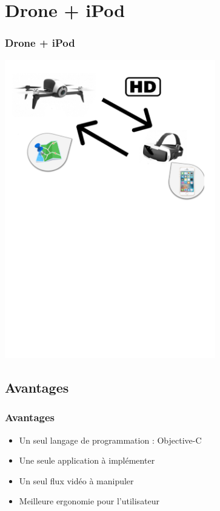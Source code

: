 \documentclass[11pt]{beamer}
\begin{document}
\section{Drone + iPod}
\begin{frame}
\frametitle{Drone + iPod}
\begin{center}
\includegraphics[height=13cm]{drone+ipod.png}
\end{center}
\end{frame}

\subsection{Avantages}
\begin{frame}
\frametitle{Avantages}
\begin{itemize}
    \item Un seul langage de programmation : Objective-C 
    
    \item Une seule application à implémenter 
     
    \item Un seul flux vidéo à manipuler 
    
    \item Meilleure ergonomie pour l'utilisateur 
  \end{itemize}
\end{frame}
\end{document}
